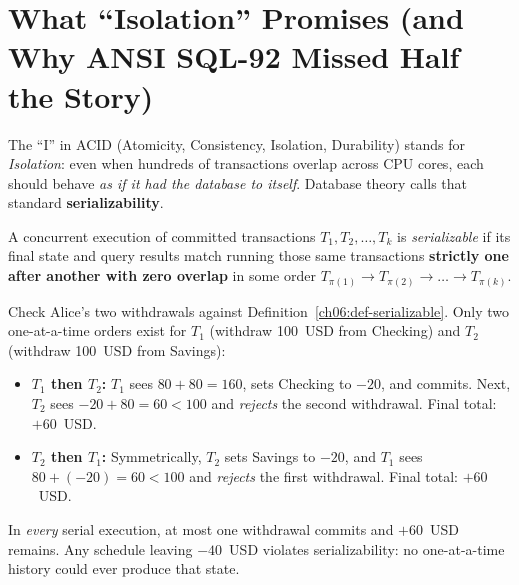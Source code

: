 \chapterline

\section{What ``Isolation'' Promises (and Why ANSI SQL-92 Missed Half the Story)}
\label{ch06:isolation-contract}

The ``I'' in ACID (Atomicity, Consistency, Isolation, Durability) stands for \emph{Isolation}: even when hundreds of transactions overlap across CPU cores, each should behave \emph{as if it had the database to itself}. Database theory calls that standard \textbf{serializability}.

\begin{definition}
\label{ch06:def-serializable}
A concurrent execution of committed transactions $T_1, T_2, \dots, T_k$ is \emph{serializable} if its final state and query results match running those same transactions \textbf{strictly one after another with zero overlap} in some order $T_{\pi(1)} \to T_{\pi(2)} \to \dots \to T_{\pi(k)}$.
\end{definition}

Check Alice's two withdrawals against Definition~\ref{ch06:def-serializable}. Only two one-at-a-time orders exist for $T_1$ (withdraw 100~USD from Checking) and $T_2$ (withdraw 100~USD from Savings):
\begin{itemize}
  \item \textbf{$T_1$ then $T_2$:} $T_1$ sees $80 + 80 = 160$, sets Checking to $-20$, and commits. Next, $T_2$ sees $-20 + 80 = 60 < 100$ and \emph{rejects} the second withdrawal. Final total: $+60$~USD.
  \item \textbf{$T_2$ then $T_1$:} Symmetrically, $T_2$ sets Savings to $-20$, and $T_1$ sees $80 + (-20) = 60 < 100$ and \emph{rejects} the first withdrawal. Final total: $+60$~USD.
\end{itemize}
In \emph{every} serial execution, at most one withdrawal commits and $+60$~USD remains. Any schedule leaving $-40$~USD violates serializability: no one-at-a-time history could ever produce that state.

